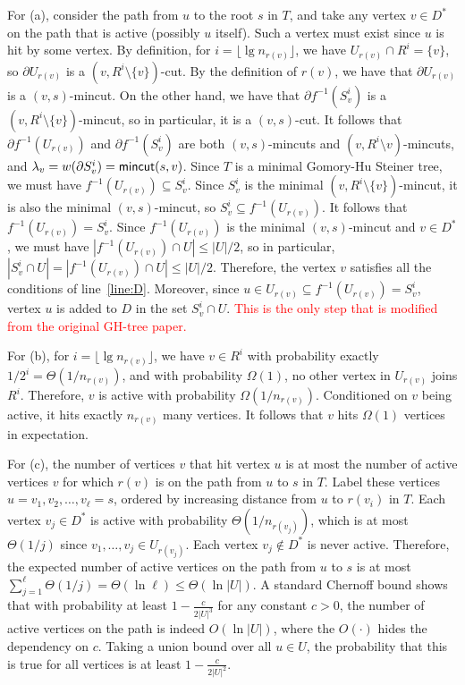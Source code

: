\documentclass{article}
\newcommand{\f}{\frac}
\newcommand{\cd}{\cdot}
\newcommand{\lds}{\ldots}
\newcommand{\sm}{\setminus}
\newcommand{\s}{\subseteq}
\newcommand{\inv}{^{-1}}
\newcommand{\la}{\lambda}
\newcommand{\pt}{\partial}
\newcommand{\Om}{\Omega}
\newcommand{\el}{\ell}
\newcommand{\Th}{\Theta}
\newcommand{\lf}{\lfloor}
\newcommand{\rf}{\rfloor}
\newcommand{\1}{\mathbbm 1}
\newcommand{\alert}{\textcolor{red}}
\renewcommand{\line}[1]{line~\ref{line:#1}}
\newcommand{\mincut}{\textsf{\textup{mincut}}}
\begin{document}
For (a), consider the path from $u$ to the root $s$ in $T$, and take any vertex $v\in D^*$ on the path that is active (possibly $u$ itself). Such a vertex must exist since $u$ is hit by some vertex. By definition, for $i=\lf\lg n_{r(v)}\rf$, we have $U_{r(v)}\cap R^i=\{v\}$, so $\pt U_{r(v)}$ is a $(v,R^i\sm \{v\})$-cut.  By the definition of $r(v)$, we have that $\pt U_{r(v)}$ is a $(v,s)$-mincut. On the other hand, we have that $\pt f\inv(S^i_v)$ is a $(v,R^i\sm\{v\})$-mincut, so in particular, it is a $(v,s)$-cut. It follows that $\pt f\inv(U_{r(v)})$ and $\pt f\inv(S^i_v)$ are both $(v,s)$-mincuts and $(v,R^i\sm v)$-mincuts, and $\la_v=w(\pt S^i_v)=\mincut(s,v)$. Since $T$ is a minimal Gomory-Hu Steiner tree, we must have $f\inv(U_{r(v)}) \s S^i_v$. Since $S^i_v$ is the minimal $(v,R^i\sm\{v\})$-mincut, it is also the minimal $(v,s)$-mincut, so $S^i_v\s f\inv(U_{r(v)}) $. It follows that $f\inv(U_{r(v)})=S^i_v$. Since $f\inv(U_{r(v)})$ is the minimal $(v,s)$-mincut and $v\in D^*$, we must have $|f\inv(U_{r(v)})\cap U|\le|U|/2$, so in particular, $|S^i_v\cap U|=|f\inv(U_{r(v)})\cap U|\le|U|/2$. Therefore, the vertex $v$ satisfies all the conditions of \line{D}. Moreover, since $u\in U_{r(v)}\s f\inv(U_{r(v)})= S^i_v$, vertex $u$ is added to $D$ in the set $S^i_v\cap U$. \alert{This is the only step that is modified from the original GH-tree paper.}

For (b), for $i=\lf\lg n_{r(v)}\rf$, we have $v\in R^i$ with probability exactly $1/2^i = \Th(1/n_{r(v)})$, and with probability $\Om(1)$, no other vertex in $U_{r(v)}$ joins $R^i$. Therefore, $v$ is active with probability $\Om(1/n_{r(v)})$. Conditioned on $v$ being active, it hits exactly $n_{r(v)}$ many vertices. It follows that $v$ hits $\Om(1)$ vertices in expectation.

For (c), the number of vertices $v$ that hit vertex $u$ is at most the number of active vertices $v$ for which $r(v)$ is on the path from $u$ to $s$ in $T$. Label these vertices $u=v_1,v_2,\lds,v_\el=s$, ordered by increasing distance from $u$ to $r(v_i)$ in $T$. Each vertex $v_j\in D^*$ is active with probability $\Th(1/n_{r(v_j)})$, which is at most $\Th(1/j)$ since $v_1,\lds,v_j \in U_{r(v_j)}$. Each vertex $v_j\notin D^*$ is never active. Therefore, the expected number of active vertices on the path from $u$ to $s$ is at most $\sum_{j=1}^\el\Th(1/j)=\Th(\ln\el)\le \Th(\ln|U|)$. A standard Chernoff bound shows that with probability at least $1-\f c{2|U|^3}$ for any constant $c>0$, the number of active vertices on the path is indeed $O(\ln|U|)$, where the $O(\cd)$ hides the dependency on $c$. Taking a union bound over all $u\in U$, the probability that this is true for all vertices is at least $1-\f c{2|U|^2}$.
\end{document}

